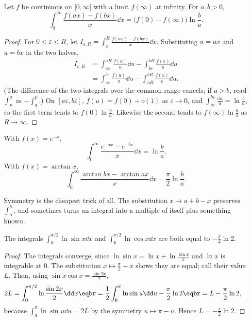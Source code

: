 \begin{theorem}[Frullani]\label{thm:frullani}
Let $f$ be continuous on $[0,\infty[$ with a limit $f(\infty)$ at infinity. For $a,b>0$,
\[
\int_0^\infty\frac{f(ax)-f(bx)}x\dd x=\bigl(f(0)-f(\infty)\bigr)\ln\frac ba.
\]
\end{theorem}
\begin{proof}
For $0<\varepsilon<R$, let $I_{\varepsilon,R}=\int_\varepsilon^R\frac{f(ax)-f(bx)}x\dd x$. Substituting $u=ax$ and $u=bx$ in the two halves,
\[
\begin{aligned}I_{\varepsilon,R}&=\int_{a\varepsilon}^{aR}\frac{f(u)}u\dd u-\int_{b\varepsilon}^{bR}\frac{f(u)}u\dd u\\&=\int_{a\varepsilon}^{b\varepsilon}\frac{f(u)}u\dd u-\int_{aR}^{bR}\frac{f(u)}u\dd u.\end{aligned}
\]
(The difference of the two integrals over the common range cancels; if $a>b$, read $\int_p^q$ as $-\int_q^p$.) On
$[a\varepsilon,b\varepsilon]$, $f(u)=f(0)+o(1)$ as $\varepsilon\to0$, and $\int_{a\varepsilon}^{b\varepsilon}\frac{\mathrm du}u=\ln\frac ba$, so the first term tends to
$f(0)\ln\frac ba$. Likewise the second tends to $f(\infty)\ln\frac ba$ as $R\to\infty$.
\end{proof}

With $f(x)=e^{-x}$,
\[
\int_0^\infty\frac{e^{-ax}-e^{-bx}}x\dd x=\ln\frac ba.
\]
With $f(x)=\arctan x$,
\[
\int_0^\infty\frac{\arctan bx-\arctan ax}x\dd x=\frac\pi2\ln\frac ba.
\]

Symmetry is the cheapest trick of all. The substitution $x\mapsto a+b-x$ preserves $\int_a^b$, and sometimes turns an
integral into a multiple of itself plus something known.

\begin{proposition}\label{prop:logsin}
The integrals $\int_0^{\pi/2}\ln\sin x\dd x$ and $\int_0^{\pi/2}\ln\cos x\dd x$ are both equal to $-\frac\pi2\ln2$.
\end{proposition}
\begin{proof}
The integrals converge, since $\ln\sin x=\ln x+\ln\frac{\sin x}x$ and $\ln x$ is integrable at $0$. The substitution $x\mapsto\frac\pi2-x$
shows they are equal; call their value $L$. Then, using $\sin x\cos x=\frac{\sin2x}2$,
\[
\begin{aligned}2L&=\int_0^{\pi/2}\ln\frac{\sin2x}2\dd x\eqbr=\frac12\int_0^\pi\ln\sin u\dd u-\frac\pi2\ln2\eqbr=L-\frac\pi2\ln2,\end{aligned}
\]
because $\int_0^\pi\ln\sin u\dd u=2L$ by the symmetry $u\mapsto\pi-u$. Hence $L=-\frac\pi2\ln2$.
\end{proof}

